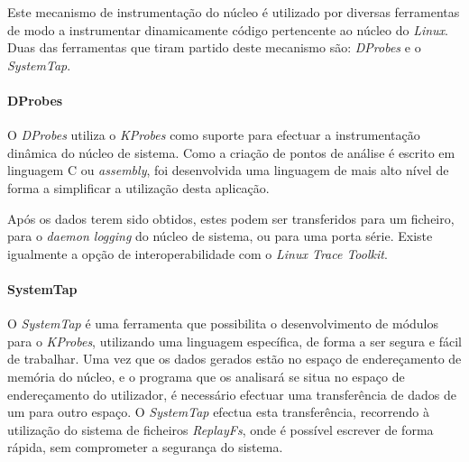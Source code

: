 Este mecanismo de instrumentação do núcleo é utilizado por diversas ferramentas de modo a instrumentar dinamicamente código pertencente ao núcleo do \textit{Linux}.
Duas das ferramentas que tiram partido deste mecanismo são: \textit{DProbes} e o \textit{SystemTap}.

\paragraph*{DProbes}
O \textit{DProbes} utiliza o \textit{KProbes} como suporte para efectuar a instrumentação dinâmica do núcleo de sistema.
Como a criação de pontos de análise é escrito em linguagem C ou \textit{assembly}, foi desenvolvida uma linguagem de mais alto nível de forma a simplificar a utilização desta aplicação.

Após os dados terem sido obtidos, estes podem ser transferidos para um ficheiro, para o \textit{daemon logging} do núcleo de sistema, ou para uma porta série.
Existe igualmente a opção de interoperabilidade com o \textit{Linux Trace Toolkit}\cite{DProbes}.

\paragraph*{SystemTap}
O \textit{SystemTap} é uma ferramenta que possibilita o desenvolvimento de módulos para o \textit{KProbes}, utilizando uma linguagem específica, de forma a ser segura e fácil de trabalhar.
Uma vez que os dados gerados estão no espaço de endereçamento de memória do núcleo, e o programa que os analisará se situa no espaço de endereçamento do utilizador, é necessário efectuar uma transferência de dados de um para outro espaço.
O \textit{SystemTap} efectua esta transferência, recorrendo à utilização do sistema de ficheiros \textit{ReplayFs}, onde é possível escrever de forma rápida, sem comprometer a segurança do sistema\cite{Donovan2007,Jones2009}.

